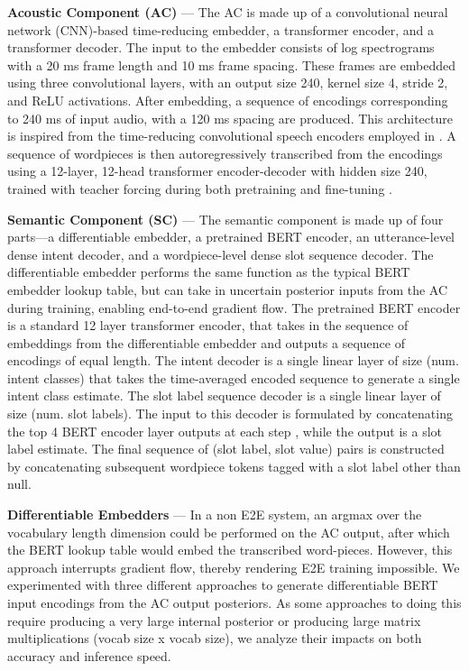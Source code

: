 \noindent \textbf{Acoustic Component (AC)} ---
The AC is made up of a convolutional neural network (CNN)-based time-reducing embedder, a transformer encoder, and a transformer decoder.
The input to the embedder consists of  log spectrograms with a 20 ms frame length and 10 ms frame spacing. These  frames are embedded using three  convolutional layers, with an output size 240, kernel size 4, stride 2, and ReLU activations. After embedding, a sequence of encodings corresponding to 240 ms of input audio, with a 120 ms spacing are produced. This architecture is inspired from the time-reducing convolutional speech encoders employed in \cite{radfar2020end}.
A sequence of wordpieces is then autoregressively transcribed from the encodings using a 12-layer, 12-head transformer encoder-decoder with hidden size 240, trained with teacher forcing during both pretraining and fine-tuning \cite{chiu2018state}.

\noindent \textbf{Semantic Component (SC)} ---
The semantic component is made up of four parts---a differentiable embedder, a pretrained BERT encoder, an utterance-level dense intent decoder, and a wordpiece-level dense slot sequence decoder.
The differentiable embedder performs the same function as the typical BERT embedder lookup table, but can take in uncertain posterior inputs from the AC during training, enabling end-to-end gradient flow. 
The pretrained BERT encoder is a standard 12 layer  transformer encoder, that takes in the sequence of embeddings from the differentiable embedder and outputs a sequence of encodings of equal length.
The intent decoder is a single linear layer of size  (num. intent classes) that takes the time-averaged encoded sequence to generate a single intent class estimate. The slot label sequence decoder is a single linear layer of size  (num. slot labels). The input to this decoder is formulated by concatenating the top 4 BERT encoder layer outputs at each step \cite{devlin2018bert}, while the output is a slot label estimate. The final sequence of (slot label, slot value) pairs is constructed by concatenating subsequent wordpiece tokens tagged with a slot label other than null.


\noindent \textbf{Differentiable Embedders} ---
\label{sec:diffemb}
In a non E2E system, an argmax over the vocabulary length dimension could be performed on the AC output, after which the BERT lookup table would embed the transcribed word-pieces. However, this approach interrupts gradient flow, thereby rendering E2E training impossible. We experimented with three different approaches to generate differentiable BERT input encodings from the AC output posteriors. As some approaches to doing this require producing a very large internal posterior or producing large matrix multiplications (vocab size x vocab size), we analyze their impacts on both accuracy and inference speed.


